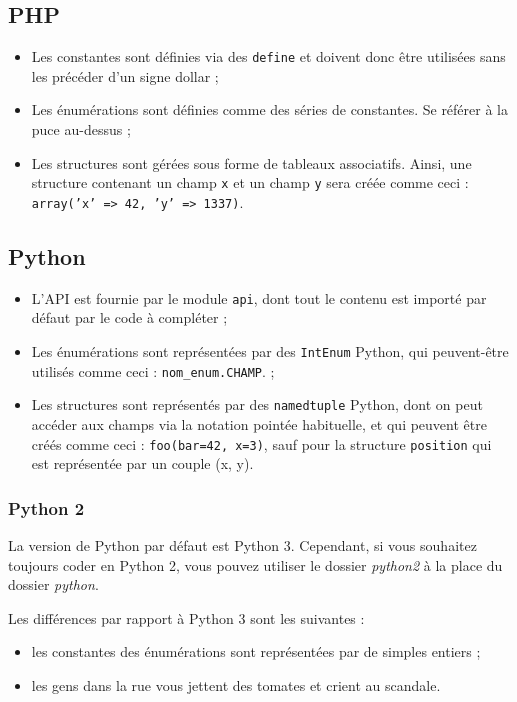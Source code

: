 \subsection{PHP}

\begin{itemize}
\item{Les constantes sont définies via des \texttt{define} et doivent donc être
      utilisées sans les précéder d'un signe dollar ;}
\item{Les énumérations sont définies comme des séries de constantes. Se référer
      à la puce au-dessus ;}
\item{Les structures sont gérées sous forme de tableaux associatifs. Ainsi, une
      structure contenant un champ \texttt{x} et un champ \texttt{y} sera créée
      comme ceci : \texttt{array('x' => 42, 'y' => 1337)}.}
\end{itemize}

\subsection{Python}

\begin{itemize}
\item{L'API est fournie par le module \texttt{api}, dont tout le contenu est
      importé par défaut par le code à compléter ;}
\item{Les énumérations sont représentées par des \texttt{IntEnum} Python, qui
    peuvent-être utilisés comme ceci : \texttt{nom\_enum.CHAMP}. ;}
\item{Les structures sont représentés par des \texttt{namedtuple} Python, dont
      on peut accéder aux champs via la notation pointée habituelle, et
      qui peuvent être créés comme ceci : \texttt{foo(bar=42, x=3)}, sauf pour
      la structure \texttt{position} qui est représentée par un couple (x, y).}
\end{itemize}

\subsubsection{Python 2}

La version de Python par défaut est Python 3. Cependant, si vous souhaitez
toujours coder en Python 2, vous pouvez utiliser le dossier \emph{python2} à la
place du dossier \emph{python}.

Les différences par rapport à Python 3 sont les suivantes :

\begin{itemize}
\item{les constantes des énumérations sont représentées par de simples entiers
      ;}
\item{les gens dans la rue vous jettent des tomates et crient au scandale.}
\end{itemize}
